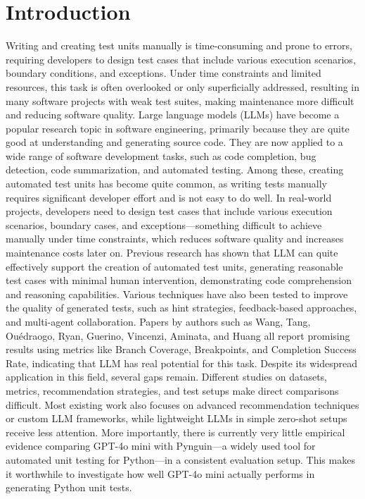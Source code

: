 \documentclass[conference]{IEEEtran}
\begin{document}
\section{Introduction}
Writing and creating test units manually is time-consuming and prone to errors, requiring developers to design test cases that include various execution scenarios, boundary conditions, and exceptions. Under time constraints and limited resources, this task is often overlooked or only superficially addressed, resulting in many software projects with weak test suites, making maintenance more difficult and reducing software quality.
Large language models (LLMs) have become a popular research topic in software engineering, primarily because they are quite good at understanding and generating source code. They are now applied to a wide range of software development tasks, such as code completion, bug detection, code summarization, and automated testing. Among these, creating automated test units has become quite common, as writing tests manually requires significant developer effort and is not easy to do well. In real-world projects, developers need to design test cases that include various execution scenarios, boundary cases, and exceptions—something difficult to achieve manually under time constraints, which reduces software quality and increases maintenance costs later on. Previous research has shown that LLM can quite effectively support the creation of automated test units, generating reasonable test cases with minimal human intervention, demonstrating code comprehension and reasoning capabilities. Various techniques have also been tested to improve the quality of generated tests, such as hint strategies, feedback-based approaches, and multi-agent collaboration. Papers by authors such as Wang, Tang, Ouédraogo, Ryan, Guerino, Vincenzi, Aminata, and Huang all report promising results using metrics like Branch Coverage, Breakpoints, and Completion Success Rate, indicating that LLM has real potential for this task.
Despite its widespread application in this field, several gaps remain. Different studies on datasets, metrics, recommendation strategies, and test setups make direct comparisons difficult. Most existing work also focuses on advanced recommendation techniques or custom LLM frameworks, while lightweight LLMs in simple zero-shot setups receive less attention. More importantly, there is currently very little empirical evidence comparing GPT-4o mini with Pynguin—a widely used tool for automated unit testing for Python—in a consistent evaluation setup. This makes it worthwhile to investigate how well GPT-4o mini actually performs in generating Python unit tests.
\end{document}
